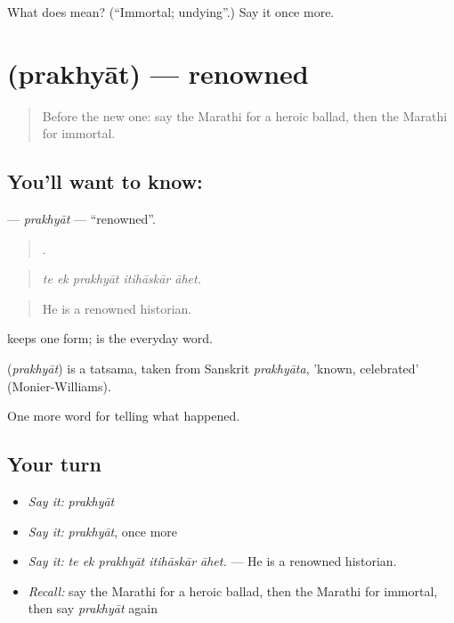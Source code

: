\begin{tcolorbox}[breakable,colback=teal!4,colframe=teal!35!black,title={Before you move on}]
What does  mean? (\textquotedblleft{}Immortal; undying\textquotedblright{}.) Say it once more.
\end{tcolorbox}
\section[\texorpdfstring{\mr{प्रख्यात} (prakhyāt)}{प्रख्यात (prakhyāt)}]{ (prakhyāt) — renowned}

\label{lesson:MR-C337-prakhyat}



\begin{quote}
Before the new one: say the Marathi for a heroic ballad, then the Marathi for immortal.
\end{quote}

\subsection*{You'll want to know: }
\textbf{} — \emph{prakhyāt} — \textquotedblleft{}renowned\textquotedblright{}.

\begin{quote}
    .
\end{quote}

\begin{quote}
\emph{te ek prakhyāt itihāskār āhet.}
\end{quote}

\begin{quote}
He is a renowned historian.
\end{quote}

 keeps one form;  is the everyday word.

\begin{cousinweb}
\textbf{} (\emph{prakhyāt}) is a tatsama, taken from Sanskrit \emph{prakhyāta}, 'known, celebrated' (Monier-Williams).
\end{cousinweb}

\begin{grammarlens}[title={What you've built}]
One more word for telling what happened.
\end{grammarlens}

\subsection*{Your turn}
\begin{itemize}
\raggedright
  \item \emph{Say it:} \emph{prakhyāt}
  \item \emph{Say it:} \emph{prakhyāt}, once more
  \item \emph{Say it:} \emph{te ek prakhyāt itihāskār āhet.} — He is a renowned historian.
  \item \emph{Recall:} say the Marathi for a heroic ballad, then the Marathi for immortal, then say \emph{prakhyāt} again
\end{itemize}


